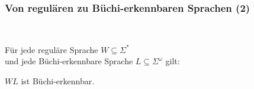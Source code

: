     \begin{frame}
      \frametitle{Von regulären zu Büchi-erkennbaren Sprachen (2)}

      \begin{lemma}
        \label{lem:Charakt_Buchi_Konkat}
        ~\par\vspace*{-1.4\baselineskip}
        Für jede reguläre Sprache $W \subseteq \Sigma^*$\\
        und jede Büchi-erkennbare Sprache $L \subseteq \Sigma^\omega$ gilt:
        \par\smallskip
        $WL$ ist Büchi-erkennbar.
      \end{lemma}

      \par\bigskip

    \end{frame}

